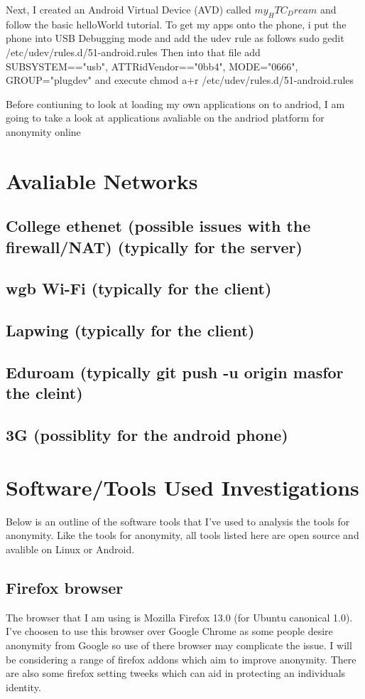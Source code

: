 \documentclass[12pt,a4paper,oneside]{article}
\begin{document}
Next, I created an Android Virtual Device (AVD) called $my_HTC_Dream$ and follow the basic helloWorld tutorial. To get my apps onto the phone, i put the phone into USB Debugging mode and add the udev rule as follows
		sudo gedit /etc/udev/rules.d/51-android.rules 
Then into that file add SUBSYSTEM=="usb", ATTR{idVendor}=="0bb4", MODE="0666", GROUP="plugdev"  and execute chmod a+r /etc/udev/rules.d/51-android.rules

Before contiuning to look at loading my own applications on to andriod, I am going to take a look at applications avaliable on the andriod platform for anonymity online

\section{Avaliable Networks}
\subsection{College ethenet (possible issues with the firewall/NAT) (typically for the server)}
\subsection{wgb Wi-Fi (typically for the client)}
\subsection{Lapwing (typically for the client)}
\subsection{Eduroam (typically git push -u origin masfor the cleint)}
\subsection{3G (possiblity for the android phone)}

\section{Software/Tools Used Investigations}
Below is an outline of the software tools that I've used to analysis the tools for anonymity. Like the tools for anonymity, all tools listed here are open source and avalible on Linux or Android.
\subsection{Firefox browser}
The browser that I am using is Mozilla Firefox 13.0 (for Ubuntu canonical 1.0). I've choosen to use this browser over Google Chrome as some people desire anonymity from Google so use of there browser may complicate the issue. I will be considering a range of firefox addons which aim to improve anonymity. There are also some firefox setting tweeks which can aid in protecting an individuals identity.
\end{document}
